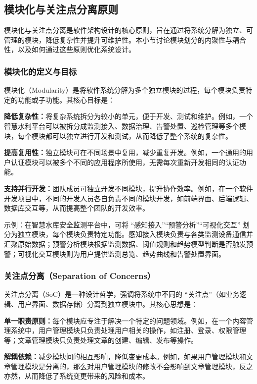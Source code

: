 \subsection{模块化与关注点分离原则}

模块化与关注点分离是软件架构设计的核心原则，旨在通过将系统分解为独立、可管理的模块，降低复杂性并提升可维护性。本小节讨论模块划分的内聚性与耦合性，以及如何通过这些原则优化系统设计。

\subsubsection{模块化的定义与目标}
模块化（Modularity）是将软件系统分解为多个独立模块的过程，每个模块负责特定的功能或子功能。其核心目标是：

\textbf{降低复杂性：}将复杂系统拆分为较小的单元，便于开发、测试和维护。例如，一个智慧水利平台可以被拆分成监测接入、数据治理、告警处置、巡检管理等多个模块，每个模块都可以独立进行开发和测试，从而降低了整个系统的复杂性。

\textbf{提高复用性：}独立模块可在不同场景中复用，减少重复开发。例如，一个通用的用户认证模块可以被多个不同的应用程序所使用，无需每次重新开发相同的认证功能。

\textbf{支持并行开发：}团队成员可独立开发不同模块，提升协作效率。例如，在一个软件开发项目中，不同的开发人员各自负责不同的模块开发，如前端界面、后端逻辑、数据库交互等，从而提高整个团队的开发效率。

示例：在智慧水库安全监测平台中，可将 “感知接入”“预警分析”“可视化交互” 划分为独立模块，每个模块负责特定功能。感知接入模块负责与各类监测设备通信并汇聚原始数据；预警分析模块根据监测数据、阈值规则和趋势模型判断是否触发预警；可视化交互模块则为用户提供监测总览、趋势曲线和告警处置界面。

\subsubsection{关注点分离（Separation of Concerns）}
关注点分离（SoC）是一种设计哲学，强调将系统中不同的 “关注点”（如业务逻辑、用户界面、数据存储）分离到独立模块中。其核心思想是：

\textbf{单一职责原则：}每个模块应专注于解决一个特定的问题领域。例如，在一个内容管理系统中，用户管理模块只负责处理用户相关的操作，如注册、登录、权限管理等；文章管理模块只负责处理文章的创建、编辑、发布等操作。

\textbf{解耦依赖：}减少模块间的相互影响，降低变更成本。例如，如果用户管理模块和文章管理模块是分离的，那么对用户管理模块的修改不会影响到文章管理模块，反之亦然，从而降低了系统变更带来的风险和成本。

